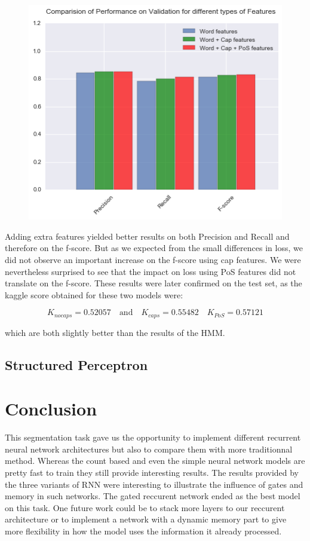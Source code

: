 \documentclass[11pt]{article}
\begin{document}
\begin{figure}[H]
\centering
\includegraphics[width=0.6\linewidth]{prf_cap}
\end{figure}

Adding extra features yielded better results on both Precision and Recall and therefore on the f-score. But as we expected from the small differences in loss, we did not observe an important increase on the f-score using cap features. We were nevertheless surprised to see that the impact on loss using PoS features did not translate on the f-score. These results were later confirmed on the test set, as the kaggle score obtained for these two models were:

$$K_{no caps} = 0.52057 \quad \text{and} \quad K_{caps} = 0.55482 \quad K_{PoS} = 0.57121$$

which are both slightly better than the results of the HMM.

\subsection{Structured Perceptron}


\section{Conclusion}

This segmentation task gave us the opportunity to implement different recurrent neural network architectures but also to compare them with more traditionnal method. Whereas the count based and even the simple neural network models are pretty fast to train they still provide interesting results. The results provided by the three variants of RNN were interesting to illustrate the influence of gates and memory in such networks. The gated reccurent network ended as the best model on this task. One future work could be to stack more layers to our reccurent architecture or to implement a network with a dynamic memory part to give more flexibility in how the model uses the information it already processed.
\end{document}
